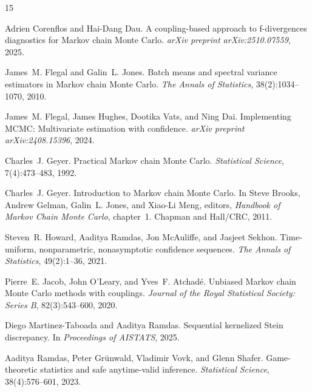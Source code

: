 \documentclass[11pt]{article}
\begin{document}
\begin{thebibliography}{15}

Adrien Corenflos and Hai-Dang Dau.
\newblock A coupling-based approach to f-divergences diagnostics for {M}arkov chain {M}onte {C}arlo.
\newblock \emph{arXiv preprint arXiv:2510.07559}, 2025.

James~M. Flegal and Galin~L. Jones.
\newblock Batch means and spectral variance estimators in {M}arkov chain {M}onte {C}arlo.
\newblock \emph{The Annals of Statistics}, 38(2):1034--1070, 2010.

James~M. Flegal, James Hughes, Dootika Vats, and Ning Dai.
\newblock Implementing {MCMC}: Multivariate estimation with confidence.
\newblock \emph{arXiv preprint arXiv:2408.15396}, 2024.

Charles~J. Geyer.
\newblock Practical {M}arkov chain {M}onte {C}arlo.
\newblock \emph{Statistical Science}, 7(4):473--483, 1992.

Charles~J. Geyer.
\newblock Introduction to {M}arkov chain {M}onte {C}arlo.
\newblock In Steve Brooks, Andrew Gelman, Galin~L. Jones, and Xiao-Li Meng, editors, \emph{Handbook of Markov Chain Monte Carlo}, chapter~1. Chapman and Hall/CRC, 2011.

Steven~R. Howard, Aaditya Ramdas, Jon McAuliffe, and Jasjeet Sekhon.
\newblock Time-uniform, nonparametric, nonasymptotic confidence sequences.
\newblock \emph{The Annals of Statistics}, 49(2):1--36, 2021.

Pierre~E. Jacob, John O'Leary, and Yves~F. Atchad\'{e}.
\newblock Unbiased {M}arkov chain {M}onte {C}arlo methods with couplings.
\newblock \emph{Journal of the Royal Statistical Society: Series B}, 82(3):543--600, 2020.

Diego Martinez-Taboada and Aaditya Ramdas.
\newblock Sequential kernelized {S}tein discrepancy.
\newblock In \emph{Proceedings of AISTATS}, 2025.

Aaditya Ramdas, Peter Gr\"{u}nwald, Vladimir Vovk, and Glenn Shafer.
\newblock Game-theoretic statistics and safe anytime-valid inference.
\newblock \emph{Statistical Science}, 38(4):576--601, 2023.


\end{thebibliography}
\end{document}
